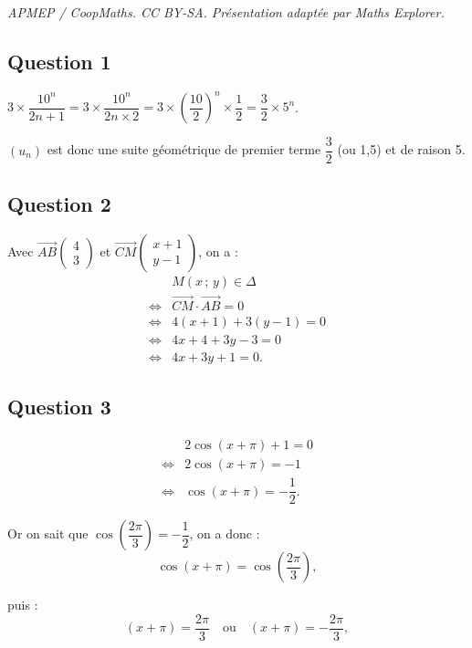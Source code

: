 \documentclass[10pt]{article}
\begin{document}
\noindent\textit{APMEP / CoopMaths. CC BY-SA. Présentation adaptée par Maths Explorer.}\par\medskip
\subsection*{Question 1}

\(3 \times \dfrac{10^n}{2n+1} = 3 \times \dfrac{10^n}{2n \times 2} = 3 \times \left(\dfrac{10}{2}\right)^n \times \dfrac{1}{2} = \dfrac{3}{2} \times 5^n\).

\((u_n)\) est donc une suite géométrique de premier terme \(\dfrac{3}{2}\) (ou 1,5) et de raison 5.

\subsection*{Question 2}

Avec \(\overrightarrow{AB} \begin{pmatrix} 4 \\ 3 \end{pmatrix}\) et \(\overrightarrow{CM} \begin{pmatrix} x + 1 \\ y - 1 \end{pmatrix}\), on a :
\begin{align*}
&M(x\,;\,y) \in \Delta \\
\iff &\overrightarrow{CM} \cdot \overrightarrow{AB} = 0 \\
\iff &4(x + 1) + 3(y - 1) = 0 \\
\iff &4x + 4 + 3y - 3 = 0 \\
\iff &4x + 3y + 1 = 0.
\end{align*}

\subsection*{Question 3}

\begin{align*}
&2\cos(x + \pi) + 1 = 0 \\
\iff &2\cos(x + \pi) = -1 \\
\iff &\cos(x + \pi) = -\dfrac{1}{2}.
\end{align*}

Or on sait que \(\cos\left(\dfrac{2\pi}{3}\right) = -\dfrac{1}{2}\), on a donc :
\[
\cos(x + \pi) = \cos\left(\dfrac{2\pi}{3}\right),
\]

puis :
\[
(x + \pi) = \dfrac{2\pi}{3} \quad \text{ou} \quad (x + \pi) = -\dfrac{2\pi}{3},
\]
\end{document}
